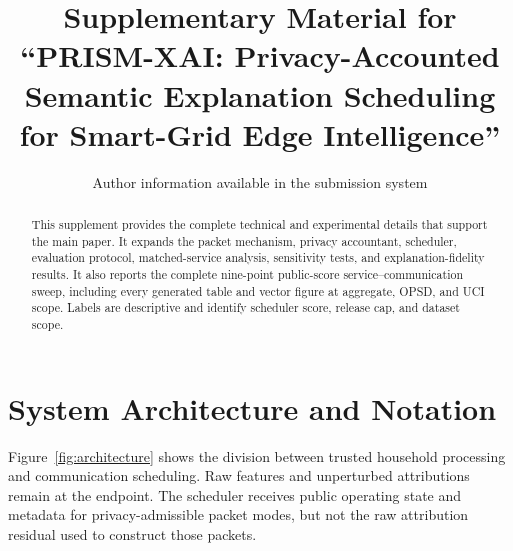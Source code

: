 \documentclass[10pt,conference]{IEEEtran}
\begin{document}
\title{Supplementary Material for\\``PRISM-XAI: Privacy-Accounted Semantic Explanation Scheduling for Smart-Grid Edge Intelligence''}
\author{Author information available in the submission system}
\maketitle

\begin{abstract}
This supplement provides the complete technical and experimental details that
support the main paper. It expands the packet mechanism, privacy accountant,
scheduler, evaluation protocol, matched-service analysis, sensitivity tests,
and explanation-fidelity results. It also reports the complete nine-point
public-score service--communication sweep, including every generated table and
vector figure at aggregate, OPSD, and UCI scope. Labels are descriptive and
identify scheduler score, release cap, and dataset scope.
\end{abstract}

\section{System Architecture and Notation}

Figure~\ref{fig:architecture} shows the division between trusted household
processing and communication scheduling. Raw features and unperturbed
attributions remain at the endpoint. The scheduler receives public operating
state and metadata for privacy-admissible packet modes, but not the raw
attribution residual used to construct those packets.
\end{document}
